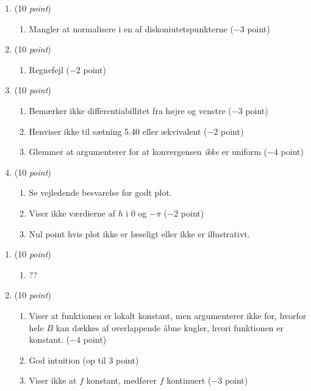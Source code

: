\documentclass{article}
\begin{document}
\begin{opg}\hfill
	\begin{enumerate}
	\item (10 \emph{point})\begin{enumerate}[label=(\roman*)]
		\item Mangler at normalisere i en af diskoniutetspunkterne ($ -3 $ point)
	\end{enumerate}
	\item (10 \emph{point})\begin{enumerate}[label=(\roman*)]
		\item Regnefejl ($ -2 $ point)
	\end{enumerate}
	\item (10 \emph{point})\begin{enumerate}[label=(\roman*)]
		\item Bemærker ikke differentiabillitet fra højre og venstre ($ -3 $ point)
		\item Henviser ikke til sætning 5.40 eller ækvivalent ($ -2 $ point)
		\item Glemmer at argumenterer for at konvergensen \emph{ikke} er uniform ($ -4 $ point)
	\end{enumerate}
	\item (10 \emph{point})\begin{enumerate}[label=(\roman*)]
		\item Se vejledende besvarelse for godt plot.
		\item Viser ikke værdierne af $ h $ i $ 0 $ og $ -\pi $ ($ -2 $ point)
		\item Nul point hvis plot ikke er læseligt eller ikke er illustrativt. 
	\end{enumerate}	
	\end{enumerate}
\end{opg} 

\begin{opg}\hfill
	\begin{enumerate}
		\item (10 \emph{point})\begin{enumerate}[label=(\roman*)]
			\item ??
		\end{enumerate}
		\item (10 \emph{point})\begin{enumerate}[label=(\roman*)]
			\item Viser at funktionen er lokalt konstant, men argumenterer ikke for, hvorfor hele $ B $ kan dækkes af overlappende åbne kugler, hvori funktionen er konstant. ($ -4 $ point)
			\item God intuition (op til $ 3 $ point)
			\item Viser ikke at $ f $ konstant, medfører $ f $ kontinuert ($ -3 $ point)
		\end{enumerate}
	\end{enumerate}
\end{opg}
\end{document}

